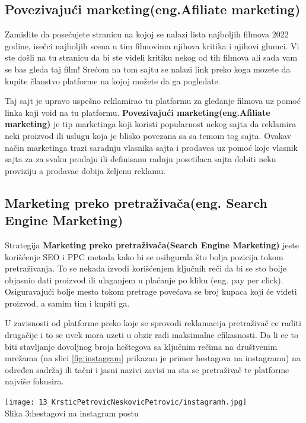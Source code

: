 \documentclass[a4paper]{article}
\begin{document}
{\subsection{Povezivajući marketing(eng.Afiliate marketing)}
\label{subsec:Povezivajući marketing(Afiliate marketing)}
Zamislite da posećujete stranicu na kojoj se nalazi lista najboljih filmova 2022 godine, isečci najboljih scena u tim filmovima njihova kritika i njihovi glumci. Vi ste došli na tu stranicu da bi ste videli kritiku nekog od tih filmova ali sada vam se bas gleda taj film! Srećom  na tom sajtu se nalazi link preko koga mozete da kupite članstvo platforme na kojoj možete da ga pogledate. 

Taj sajt je upravo uspešno reklamirao tu platformu za gledanje filmova uz pomoć linka koji void na tu platformu. \textbf{Povezivajući marketing(eng.Afiliate marketing)} je tip marketinga koji koristi popularnost nekog sajta da reklamira neki proizvod ili uslugu koja je blisko povezana sa sa temom tog sajta. 
Ovakav način marketinga trazi saradnju vlasnika sajta i prodavca uz pomoć koje vlasnik sajta za za svaku prodaju ili definisanu radnju posetilaca sajta dobiti neku proviziju a prodavac dobija željenu reklamu.







\subsection{Marketing preko pretraživača(eng. Search Engine Marketing) }
\label{subsec:SAM}
Strategija \textbf{Marketing preko pretraživača(Search Engine Marketing)} jeste korišćenje SEO i PPC metoda kako bi se osihgurala što bolja pozicija tokom pretraživanja. To se nekada izvodi korišćenjem ključnih reči da bi se sto bolje objasnio dati proizvod ili ulaganjem u plaćanje po kliku (eng. pay per click). Osiguravajući bolje mesto tokom pretrage povećava se broj kupaca koji će videti proizvod, a samim tim i kupiti ga.

 U zavisnosti od platforme preko koje se sprovodi reklamacija pretraživač ce raditi drugačije i to se uvek mora uzeti u obzir radi maksimalne efikasnosti. Da li ce to biti stavljanje dovoljnog broja heštegova sa ključnim rečima na društvenim mrežama (na slici \ref{fig:instagram} prikazan je primer hestagova na instagramu) na određen sadržaj ili tačni i jasni nazivi zavisi na sta se pretraživač te platforme najviše fokusira.


\begin{center}
    \texttt{[image: 13\_KrsticPetrovicNeskovicPetrovic/instagramh.jpg]}\\
    \large{Slika 3:hestagovi na instagram postu}
\end{center}
\label{fig:instagram}

}
\end{document}
